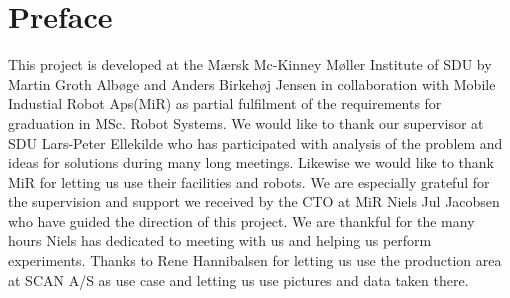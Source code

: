 \chapter*{Preface}
This project is developed at the Mærsk Mc-Kinney Møller Institute of SDU by Martin Groth Albøge and Anders Birkehøj Jensen in collaboration with Mobile Industial Robot Aps(MiR)  as partial fulfilment of the requirements for graduation in MSc. Robot Systems. 
We would like to thank our supervisor at SDU Lars-Peter Ellekilde who has participated with analysis of the problem and ideas for solutions during many long meetings.
Likewise we would like to thank MiR for letting us use their facilities and robots.
We are especially grateful for the supervision and support we received by the CTO at MiR Niels Jul Jacobsen who have guided the direction of this project.
We are thankful for the many hours Niels has dedicated to meeting with us and helping us perform experiments.
Thanks to Rene Hannibalsen for letting us use the production area at SCAN A/S as use case and letting us use pictures and data taken there.

\vspace{1 cm}

